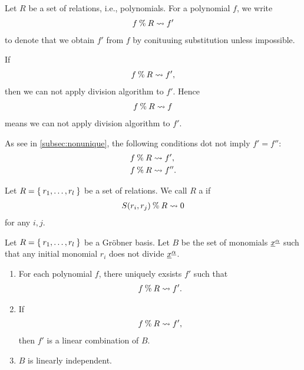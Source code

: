 Let $R$ be a set of relations, i.e., polynomials.
For a polynomial $f$,
we write
\begin{align*}
  f\mathbin{\%} R \leadsto f'
\end{align*}
to denote that
we obtain $f'$ from $f$
by conituuing substitution unless impossible.
\begin{remark}
If 
  \begin{align*}
  f\mathbin{\%} R \leadsto f',
  \end{align*}
  then we can not apply division algorithm to $f'$.
  Hence
  \begin{align*}
    f\mathbin{\%} R \leadsto f
  \end{align*}
  means we can not apply division algorithm to $f'$.
\end{remark}

\begin{remark}
  As see in \cref{subsec:nonunique},
  the following conditions
  dot not imply $f'=f''$:
  \begin{align*}
  &f\mathbin{\%} R \leadsto f',\\
  &f\mathbin{\%} R \leadsto f''.
  \end{align*}
\end{remark}

\begin{definition}
  Let $R=\Set{r_1,\ldots,r_l}$ be a set of relations.
  We call $R$ a 
  if
  \begin{align*}
    S(r_i,r_j) \mathbin{\%} R \leadsto 0
  \end{align*}
  for any $i,j$.
\end{definition}
\begin{theorem}
  Let $R=\Set{r_1,\ldots,r_l}$ be a Gr\"obner basis.
  Let $B$ be the set of monomials ${\underline{x}}^{\underline{\alpha}}$
  such that any initial monomial $r_i$ does not divide ${\underline{x}}^{\underline{\alpha}}$.
  \begin{enumerate}
  \item For each polynomial $f$,
    there uniquely exsists $f'$ such that
    \begin{align*}
      f\mathbin{\%} R \leadsto f'.
    \end{align*}
  \item If   
    \begin{align*}
      f\mathbin{\%} R \leadsto f',
    \end{align*}
    then $f'$ is a linear combination of $B$.
  \item $B$ is linearly independent.
 \end{enumerate}
\end{theorem}

